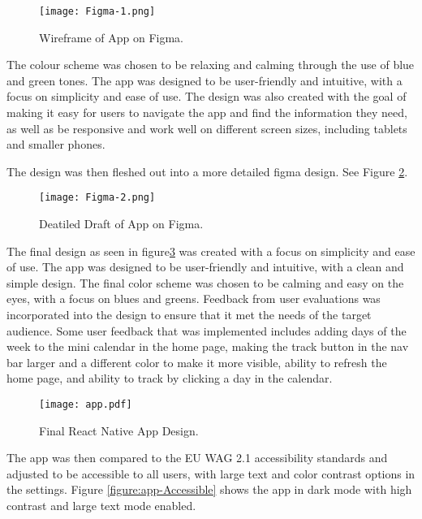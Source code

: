 \begin{figure}[h!!]
  \begin{center}
    \texttt{[image: Figma-1.png]}
    \caption{Wireframe of App on Figma.}
    \label{figure:figma-1}
  \end{center}
\end{figure}

The colour scheme was chosen to be relaxing and calming  through the use of blue and green tones. The app was designed to be user-friendly and intuitive, with a focus on simplicity and ease of use. The design was also created with the goal of making it easy for users to navigate the app and find the information they need, as well as be responsive and work well on different screen sizes, including tablets and smaller phones.  

The design was then fleshed out into a more detailed figma design. See Figure \ref{figure:figma-2}.

\begin{figure}[h!!]
  \begin{center}
    \texttt{[image: Figma-2.png]}
    \caption{Deatiled Draft of App on Figma.}
    \label{figure:figma-2}
  \end{center}
\end{figure}

The final design as seen in figure\ref{figure:app} was created with a focus on simplicity and ease of use. The app was designed to be user-friendly and intuitive, with a clean and simple design. The final color scheme was chosen to be calming and easy on the eyes, with a focus on blues and greens. Feedback from user evaluations was incorporated into the design to ensure that it met the needs of the target audience. Some user feedback that was implemented includes adding days of the week to the mini calendar in the home page, making the track button in the nav bar larger and a different color to make it more visible, ability to refresh the home page, and ability to track by clicking a day in the calendar. 

\begin{figure}[h!!]
  \begin{center}
    \texttt{[image: app.pdf]}
    \caption{Final React Native App Design.}
    \label{figure:app}
  \end{center}
\end{figure}


The app was then compared to the EU WAG 2.1 accessibility standards and adjusted to be accessible to all users, with large text and color contrast options in the settings. Figure \ref{figure:app-Accessible} shows the app in dark mode with high contrast and large text mode enabled.
 

